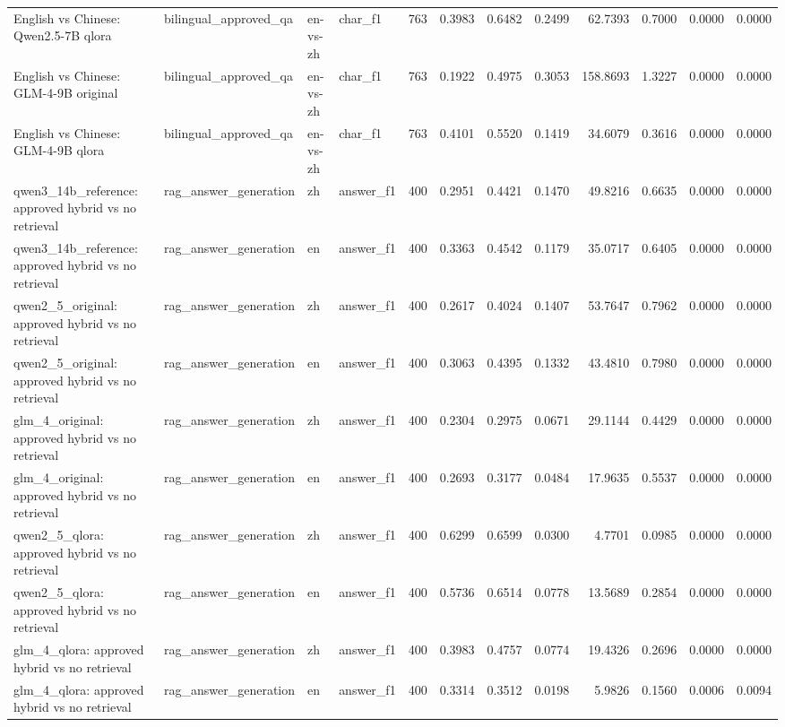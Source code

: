 \begin{tabular}{llllrrrrrrrr}
English vs Chinese: Qwen2.5-7B qlora & bilingual_approved_qa & en-vs-zh & char_f1 & 763 & 0.3983 & 0.6482 & 0.2499 & 62.7393 & 0.7000 & 0.0000 & 0.0000 \\
English vs Chinese: GLM-4-9B original & bilingual_approved_qa & en-vs-zh & char_f1 & 763 & 0.1922 & 0.4975 & 0.3053 & 158.8693 & 1.3227 & 0.0000 & 0.0000 \\
English vs Chinese: GLM-4-9B qlora & bilingual_approved_qa & en-vs-zh & char_f1 & 763 & 0.4101 & 0.5520 & 0.1419 & 34.6079 & 0.3616 & 0.0000 & 0.0000 \\
qwen3_14b_reference: approved hybrid vs no retrieval & rag_answer_generation & zh & answer_f1 & 400 & 0.2951 & 0.4421 & 0.1470 & 49.8216 & 0.6635 & 0.0000 & 0.0000 \\
qwen3_14b_reference: approved hybrid vs no retrieval & rag_answer_generation & en & answer_f1 & 400 & 0.3363 & 0.4542 & 0.1179 & 35.0717 & 0.6405 & 0.0000 & 0.0000 \\
qwen2_5_original: approved hybrid vs no retrieval & rag_answer_generation & zh & answer_f1 & 400 & 0.2617 & 0.4024 & 0.1407 & 53.7647 & 0.7962 & 0.0000 & 0.0000 \\
qwen2_5_original: approved hybrid vs no retrieval & rag_answer_generation & en & answer_f1 & 400 & 0.3063 & 0.4395 & 0.1332 & 43.4810 & 0.7980 & 0.0000 & 0.0000 \\
glm_4_original: approved hybrid vs no retrieval & rag_answer_generation & zh & answer_f1 & 400 & 0.2304 & 0.2975 & 0.0671 & 29.1144 & 0.4429 & 0.0000 & 0.0000 \\
glm_4_original: approved hybrid vs no retrieval & rag_answer_generation & en & answer_f1 & 400 & 0.2693 & 0.3177 & 0.0484 & 17.9635 & 0.5537 & 0.0000 & 0.0000 \\
qwen2_5_qlora: approved hybrid vs no retrieval & rag_answer_generation & zh & answer_f1 & 400 & 0.6299 & 0.6599 & 0.0300 & 4.7701 & 0.0985 & 0.0000 & 0.0000 \\
qwen2_5_qlora: approved hybrid vs no retrieval & rag_answer_generation & en & answer_f1 & 400 & 0.5736 & 0.6514 & 0.0778 & 13.5689 & 0.2854 & 0.0000 & 0.0000 \\
glm_4_qlora: approved hybrid vs no retrieval & rag_answer_generation & zh & answer_f1 & 400 & 0.3983 & 0.4757 & 0.0774 & 19.4326 & 0.2696 & 0.0000 & 0.0000 \\
glm_4_qlora: approved hybrid vs no retrieval & rag_answer_generation & en & answer_f1 & 400 & 0.3314 & 0.3512 & 0.0198 & 5.9826 & 0.1560 & 0.0006 & 0.0094 \\

\end{tabular}
